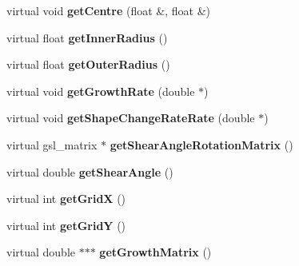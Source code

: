 \begin{DoxyCompactItemize}
\item 
\hypertarget{classGrowthFunctionBase_a93aef4238b9da5d0b06cf18c552d3ca3}{}virtual void {\bfseries get\+Centre} (float \&, float \&)\label{classGrowthFunctionBase_a93aef4238b9da5d0b06cf18c552d3ca3}

\item 
\hypertarget{classGrowthFunctionBase_a05ace7e6cb21566ad03e72e56962d58b}{}virtual float {\bfseries get\+Inner\+Radius} ()\label{classGrowthFunctionBase_a05ace7e6cb21566ad03e72e56962d58b}

\item 
\hypertarget{classGrowthFunctionBase_a2ba8f7659e1c0546998671458943233d}{}virtual float {\bfseries get\+Outer\+Radius} ()\label{classGrowthFunctionBase_a2ba8f7659e1c0546998671458943233d}

\item 
\hypertarget{classGrowthFunctionBase_a2c518c297bc1bbf996f6e7df758a0cc7}{}virtual void {\bfseries get\+Growth\+Rate} (double $\ast$)\label{classGrowthFunctionBase_a2c518c297bc1bbf996f6e7df758a0cc7}

\item 
\hypertarget{classGrowthFunctionBase_aa2b72fe18b40e73b463200b7cc7f6884}{}virtual void {\bfseries get\+Shape\+Change\+Rate\+Rate} (double $\ast$)\label{classGrowthFunctionBase_aa2b72fe18b40e73b463200b7cc7f6884}

\item 
\hypertarget{classGrowthFunctionBase_a3c0d71849d020d29832b1aaaba87065e}{}virtual gsl\+\_\+matrix $\ast$ {\bfseries get\+Shear\+Angle\+Rotation\+Matrix} ()\label{classGrowthFunctionBase_a3c0d71849d020d29832b1aaaba87065e}

\item 
\hypertarget{classGrowthFunctionBase_adea116613ddb2edb7ebc0734d17c9226}{}virtual double {\bfseries get\+Shear\+Angle} ()\label{classGrowthFunctionBase_adea116613ddb2edb7ebc0734d17c9226}

\item 
\hypertarget{classGrowthFunctionBase_a1dfd024db9bf627777741c68f7b5ddf2}{}virtual int {\bfseries get\+Grid\+X} ()\label{classGrowthFunctionBase_a1dfd024db9bf627777741c68f7b5ddf2}

\item 
\hypertarget{classGrowthFunctionBase_a1445bfc812abb72fd6757859aa302feb}{}virtual int {\bfseries get\+Grid\+Y} ()\label{classGrowthFunctionBase_a1445bfc812abb72fd6757859aa302feb}

\item 
\hypertarget{classGrowthFunctionBase_a067bdcd836e7196ce5cfc9120b9499c1}{}virtual double $\ast$$\ast$$\ast$ {\bfseries get\+Growth\+Matrix} ()\label{classGrowthFunctionBase_a067bdcd836e7196ce5cfc9120b9499c1}


\end{DoxyCompactItemize}
